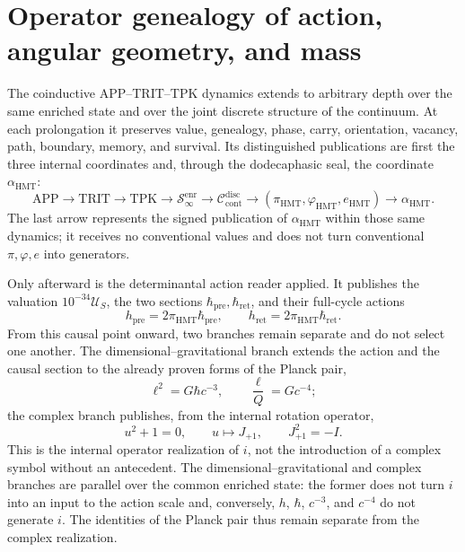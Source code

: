 
\section{Operator genealogy of action, angular geometry, and mass}
\label{sec:l9s102:transicion-constantes-accion-geometria-masas}

The coinductive APP--TRIT--TPK dynamics extends to arbitrary depth
over the same enriched state and over the joint discrete structure of the
continuum. At each prolongation it preserves value, genealogy, phase, carry,
orientation, vacancy, path, boundary, memory, and survival. Its
distinguished publications are first the three internal coordinates and,
through the dodecaphasic seal, the coordinate \(\alpha_{\mathrm{HMT}}\):
\[
 \mathrm{APP}\longrightarrow\mathrm{TRIT}\longrightarrow\mathrm{TPK}
 \longrightarrow\mathcal S_{\infty}^{\mathrm{enr}}
 \longrightarrow\mathcal C_{\mathrm{cont}}^{\mathrm{disc}}
 \longrightarrow(\pi_{\mathrm{HMT}},\varphi_{\mathrm{HMT}},e_{\mathrm{HMT}})
 \longrightarrow\alpha_{\mathrm{HMT}}.
\]
The last arrow represents the signed publication of
\(\alpha_{\mathrm{HMT}}\) within those same dynamics; it receives no conventional
values and does not turn conventional \(\pi,\varphi,e\) into generators.

Only afterward is the determinantal action reader applied. It publishes the
valuation \(10^{-34}\mathcal U_S\), the two sections
\(\hbar_{\mathrm{pre}},\hbar_{\mathrm{ret}}\), and their full-cycle
actions
\[
 h_{\mathrm{pre}}=2\pi_{\mathrm{HMT}}\hbar_{\mathrm{pre}},
 \qquad
 h_{\mathrm{ret}}=2\pi_{\mathrm{HMT}}\hbar_{\mathrm{ret}}.
\]
From this causal point onward, two branches remain separate and do not
select one another. The dimensional--gravitational branch extends the action and
the causal section to the already proven forms of the Planck pair,
\[
 \ell^{2}=G\hbar c^{-3},
 \qquad
 \frac{\ell}{Q}=Gc^{-4};
\]
the complex branch publishes, from the internal rotation operator,
\[
 u^2+1=0,
 \qquad u\longmapsto J_{+1},
 \qquad J_{+1}^{2}=-I.
\]
This is the internal operator realization of \(i\), not the introduction of a
complex symbol without an antecedent. The dimensional--gravitational and
complex branches are parallel over the common enriched state: the former does not
turn \(i\) into an input to the action scale and, conversely,
\(h\), \(\hbar\), \(c^{-3}\), and \(c^{-4}\) do not generate \(i\). The identities
of the Planck pair thus remain separate from the complex realization.

